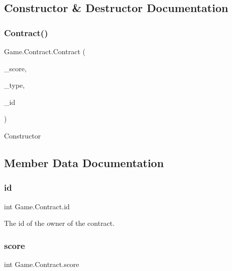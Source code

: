 \subsection{Constructor \& Destructor Documentation}
\mbox{\label{class_game_1_1_contract_af6d4eea1e5b3806455598204dcb3e0dd}} 
\subsubsection{\texorpdfstring{Contract()}{Contract()}}
{\footnotesize\ttfamily Game.\+Contract.\+Contract (\begin{DoxyParamCaption}\item[{int}]{\+\_\+score,  }\item[{\hyperlink{namespace_game_ae93b4df2175d9820e5d19dc1ab708e7e}{C\+O\+N\+T\+R\+A\+C\+T\+\_\+\+T\+Y\+PE}}]{\+\_\+type,  }\item[{int}]{\+\_\+id }\end{DoxyParamCaption})\hspace{0.3cm}{\ttfamily [inline]}}

Constructor 

\subsection{Member Data Documentation}
\mbox{\label{class_game_1_1_contract_ab55a029c5f95f70064c1cc23af7ae037}} 
\subsubsection{\texorpdfstring{id}{id}}
{\footnotesize\ttfamily int Game.\+Contract.\+id}

The id of the owner of the contract. \mbox{\label{class_game_1_1_contract_ac3f1ab61a37b44103e6a039142d47ce8}} 
\subsubsection{\texorpdfstring{score}{score}}
{\footnotesize\ttfamily int Game.\+Contract.\+score}

